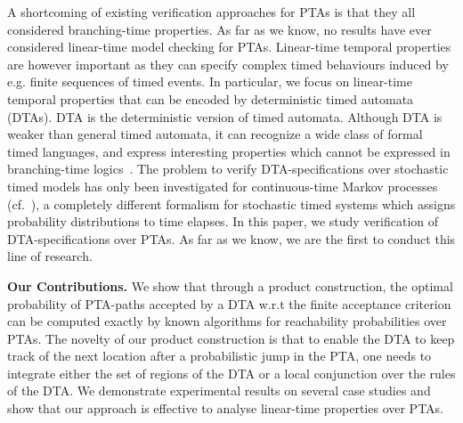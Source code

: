 A shortcoming of existing verification approaches for PTAs is that they all considered branching-time properties.
As far as we know, no results have ever considered linear-time model checking for PTAs.
Linear-time temporal properties are however important as they can specify complex timed behaviours induced by e.g. finite sequences of timed events.
In particular, we focus on linear-time temporal properties that can be encoded by deterministic timed automata (DTAs).
DTA is the deterministic version of timed automata.
Although DTA is weaker than general timed automata, it can recognize a wide class of formal timed languages, and express interesting properties which cannot be expressed in branching-time logics~\cite{DBLP:journals/tse/DonatelliHS09}.
The problem to verify DTA-specifications over stochastic timed models has only been investigated for continuous-time Markov processes (cf.~\cite{DBLP:journals/tse/DonatelliHS09,DBLP:journals/corr/abs-1101-3694,DBLP:conf/hybrid/Fu13,DBLP:conf/hybrid/BrazdilKKKR11,DBLP:conf/tacas/BarbotCHKM11,DBLP:conf/formats/BortolussiL15}), a completely different formalism for stochastic timed systems which assigns probability distributions to time elapses.
In this paper, we study verification of DTA-specifications over PTAs.
As far as we know, we are the first to conduct this line of research.

\textbf{Our Contributions.} We show that through a product construction, the optimal probability of PTA-paths accepted by a DTA w.r.t the finite acceptance criterion can be computed exactly by known algorithms for reachability probabilities over PTAs.
The novelty of our product construction is that to enable the DTA to keep track of the next location after a probabilistic jump in the PTA, one needs to integrate either the set of regions of the DTA or a local conjunction over the rules of the DTA.
We demonstrate experimental results on several case studies and show that our approach is effective to analyse linear-time properties over PTAs.











